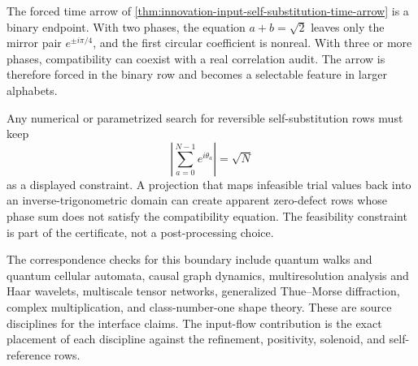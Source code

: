 \begin{principle}
\label{prin:innovation-input-binary-endpoint}
The forced time arrow of \autoref{thm:innovation-input-self-substitution-time-arrow}
is a binary endpoint. With two phases, the equation
$a+b=\sqrt2$ leaves only the mirror pair
$e^{\pm i\pi/4}$, and the first circular coefficient is nonreal. With
three or more phases, compatibility can coexist with a real
correlation audit. The arrow is therefore forced in the binary row and
becomes a selectable feature in larger alphabets.
\end{principle}

\begin{principle}
\label{prin:innovation-input-phase-search-feasibility-audit}
Any numerical or parametrized search for reversible self-substitution rows
must keep
$$
\left|\sum_{a=0}^{N-1}e^{i\theta_a}\right|=\sqrt N
$$
as a displayed constraint. A projection that maps infeasible trial values
back into an inverse-trigonometric domain can create apparent zero-defect
rows whose phase sum does not satisfy the compatibility equation. The
feasibility constraint is part of the certificate, not a post-processing
choice.
\end{principle}

\begin{principle}
\label{prin:innovation-input-lineage-correspondence-ledger}
The correspondence checks for this boundary include quantum walks and
quantum cellular automata, causal graph dynamics, multiresolution analysis
and Haar wavelets, multiscale tensor networks, generalized Thue--Morse
diffraction, complex multiplication, and class-number-one shape theory.
These are source disciplines for the interface claims. The input-flow
contribution is the exact placement of each discipline against the
refinement, positivity, solenoid, and self-reference rows.
\end{principle}
